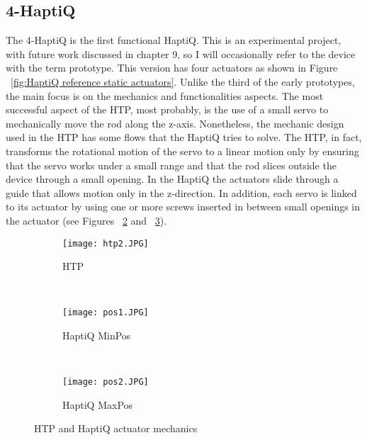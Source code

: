 \subsection{4-HaptiQ}
The 4-HaptiQ is the first functional HaptiQ. This is an experimental project, with future work discussed in chapter 9, so I will occasionally refer to the device with the term prototype. This version has four actuators as shown in Figure ~\ref{fig:HaptiQ reference static actuators}. Unlike the third of the early prototypes, the main focus is on the mechanics and functionalities aspects.
The most successful aspect of the HTP, most probably, is the use of a small servo to mechanically move the rod along the z-axis. Nonetheless, the mechanic design used in the HTP has some flows that the HaptiQ tries to solve. The HTP, in fact, transforms the rotational motion of the servo to a linear motion only by ensuring that the servo works under a small range and that the rod slices outside the device through a small opening.
In the HaptiQ the actuators slide through a guide that allows motion only in the z-direction. In addition, each servo is linked to its actuator by using one or more screws inserted in between small openings in the actuator (see Figures ~\ref{fig:HaptiQ MinPos} and ~\ref{fig:HaptiQ MaxPos}). 

\begin{figure}
        \centering
        \begin{subfigure}[H]{0.3\textwidth}
                \texttt{[image: htp2.JPG]}
                \caption{HTP}
                \label{fig:Mechanics HTP}
        \end{subfigure}%
        ~ %
        \begin{subfigure}[H]{0.3\textwidth}
                \texttt{[image: pos1.JPG]}
                \caption{HaptiQ MinPos}
                \label{fig:HaptiQ MinPos}
        \end{subfigure}
        ~ %
        \begin{subfigure}[H]{0.3\textwidth}
                \texttt{[image: pos2.JPG]}
                \caption{HaptiQ MaxPos}
                \label{fig:HaptiQ MaxPos}
        \end{subfigure}
        \caption{HTP and HaptiQ actuator mechanics}\label{fig:HTP and HaptiQ actuator mechanics}
\end{figure}

